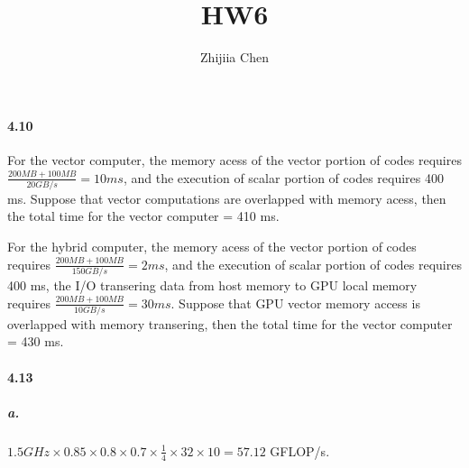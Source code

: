 \documentclass{article}
\title{HW6}
\author{Zhijiia Chen}
\begin{document}
\maketitle

\paragraph{4.10} For the vector computer, the memory acess of the vector portion of codes requires $\frac{200 MB+100 MB}{20 GB/s}=10 ms$, and the execution of scalar portion of codes requires 400 ms. Suppose that vector computations are overlapped with memory acess, then the total time for the vector computer = 410 ms.

For the hybrid computer, the memory acess of the vector portion of codes requires $\frac{200 MB+100 MB}{150 GB/s}=2 ms$, and the execution of scalar portion of codes requires 400 ms, the I/O transering data from host memory to GPU local memory requires $\frac{200 MB+100 MB}{10 GB/s}=30 ms$. Suppose that GPU vector memory access is overlapped with memory transering, then the total time for the vector computer = 430 ms.

\paragraph{4.13} 

\subparagraph{a.} $1.5 GHz\times 0.85\times 0.8\times 0.7\times \frac{1}{4}\times 32\times 10 = 57.12$ GFLOP/s.
\end{document}
